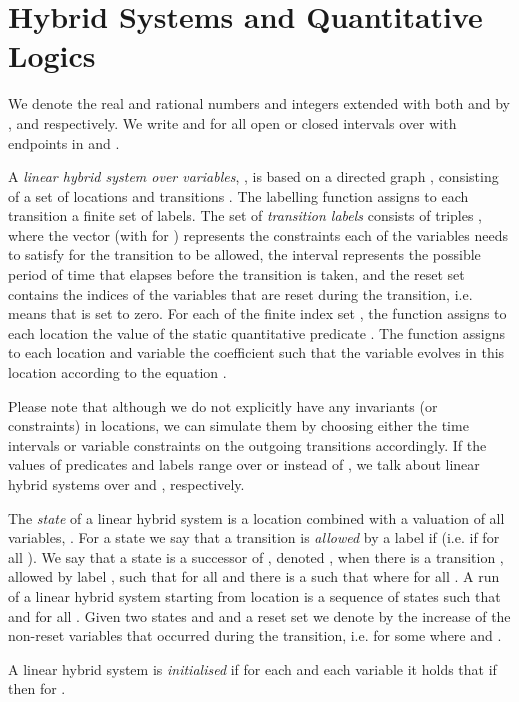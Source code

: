 \documentclass[fleqn,envcountsame]{LMCS}
\newcommand{\ie}{i.e.\xspace}
\begin{document}
\section{Hybrid Systems and Quantitative Logics} \label{sec_hybrid}
We denote the real and rational numbers and integers extended with both
 and  by ,  and  respectively.
We write  and  for all open or closed
intervals over  with endpoints in  and .

\begin{defi}
A \emph{linear hybrid system over  variables},
,
is based on a directed graph , consisting of a set of locations 
and transitions . The labelling function
 assigns to each transition
a finite set of labels. The set  of \emph{transition labels}
consists of triples , where the vector
 (with  for
) represents the constraints each of the variables
needs to satisfy for the transition to be allowed, the interval
 represents the possible period of time
that elapses before the transition is taken,
and the reset set  contains the indices of the
variables that are reset during the transition, 
\ie  means that  is set to zero.
For each  of the finite index set ,
the function  assigns to each location
the value of the static quantitative predicate .
The function  assigns to each location
and variable  the coefficient  such that the variable evolves
in this location according to the equation .
\end{defi}

Please note that although we do not explicitly have any invariants
(or constraints) in locations, we can simulate them by choosing either
the time intervals or variable constraints on the outgoing transitions
accordingly. If the values of predicates and labels range over 
or  instead of , we talk about linear hybrid systems
over  and , respectively. 

The \emph{state} of a linear hybrid system  is a location
combined with a valuation of all  variables, .
For a state  we say that a transition
 is \emph{allowed} by a label 
if  (\ie if  for all ).
We say that a state  is a successor of ,
denoted , when there is a transition ,
allowed by label , such that  for all  and
there is a  such that  where 
 for all .
A run of a linear hybrid system starting from location  is
a sequence of states  such that 
and  for all . Given two states  and
 and a reset set  we denote by
 the increase of the non-reset variables that occurred during the
transition, \ie  for some  where
 and . 

\begin{defi}
A linear hybrid system  is \emph{initialised} if for each
 and each variable  it holds that if 
 then  for .
\end{defi}
\end{document}
